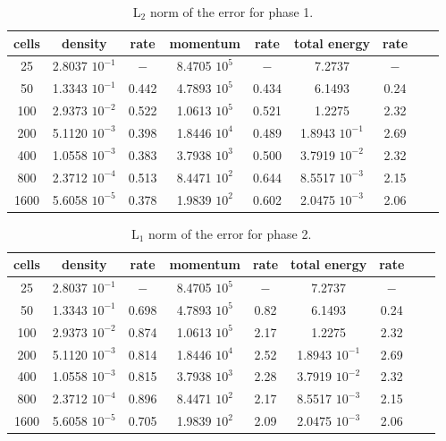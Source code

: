 \documentclass[preprint,10pt]{elsarticle}
\begin{document}
\begin{table}[H]
\begin{center}
 \caption{\label{tbl:l2-norm-indp-phase-1} L$_2$ norm of the error for phase 1.}
 \begin{tabular}{|c|c|c|c|c|c|c|c|c|}
 \hline
cells& density            & rate & momentum          & rate & total energy           & rate \\ \hline
25      & 2.8037 $10^{-1}$ & $-$    & 8.4705 $10^{5}$ & $-$     & 7.2737           & $-$      \\ \hline
50      & 1.3343 $10^{-1}$ & 0.442 & 4.7893 $10^{5}$ & 0.434 & 6.1493           & 0.24 \\ \hline
100    & 2.9373 $10^{-2}$ & 0.522 & 1.0613 $10^{5}$ & 0.521  & 1.2275           & 2.32   \\ \hline
200    & 5.1120 $10^{-3}$ & 0.398 & 1.8446 $10^{4}$ & 0.489  & 1.8943 $10^{-1}$ & 2.69   \\ \hline
400    & 1.0558 $10^{-3}$ & 0.383 & 3.7938 $10^{3}$ & 0.500  & 3.7919 $10^{-2}$ & 2.32   \\ \hline
800    & 2.3712 $10^{-4}$ & 0.513 & 8.4471 $10^{2}$ & 0.644 & 8.5517 $10^{-3}$ & 2.15   \\ \hline
1600  & 5.6058 $10^{-5}$ & 0.378 & 1.9839 $10^{2}$ & 0.602  & 2.0475 $10^{-3}$ & 2.06   \\ \hline
\end{tabular}
\end{center}
\end{table}
%
\begin{table}[H]
\begin{center}
 \caption{\label{tbl:l1-norm-indp-phase-2} L$_1$ norm of the error for phase 2.}
 \begin{tabular}{|c|c|c|c|c|c|c|c|c|}
 \hline
cells & density         & rate   & momentum        & rate    & total energy         & rate     \\ \hline
25      & 2.8037 $10^{-1}$ & $-$    & 8.4705 $10^{5}$ & $-$     & 7.2737           & $-$      \\ \hline
50      & 1.3343 $10^{-1}$ & 0.698 & 4.7893 $10^{5}$ & 0.82 & 6.1493           & 0.24 \\ \hline
100    & 2.9373 $10^{-2}$ & 0.874 & 1.0613 $10^{5}$ & 2.17  & 1.2275           & 2.32   \\ \hline
200    & 5.1120 $10^{-3}$ & 0.814 & 1.8446 $10^{4}$ & 2.52  & 1.8943 $10^{-1}$ & 2.69   \\ \hline
400    & 1.0558 $10^{-3}$ & 0.815 & 3.7938 $10^{3}$ & 2.28  & 3.7919 $10^{-2}$ & 2.32   \\ \hline
800    & 2.3712 $10^{-4}$ & 0.896 & 8.4471 $10^{2}$ & 2.17  & 8.5517 $10^{-3}$ & 2.15   \\ \hline
1600  & 5.6058 $10^{-5}$ & 0.705 & 1.9839 $10^{2}$ & 2.09  & 2.0475 $10^{-3}$ & 2.06   \\ \hline
\end{tabular}
\end{center}
\end{table}
\end{document}
